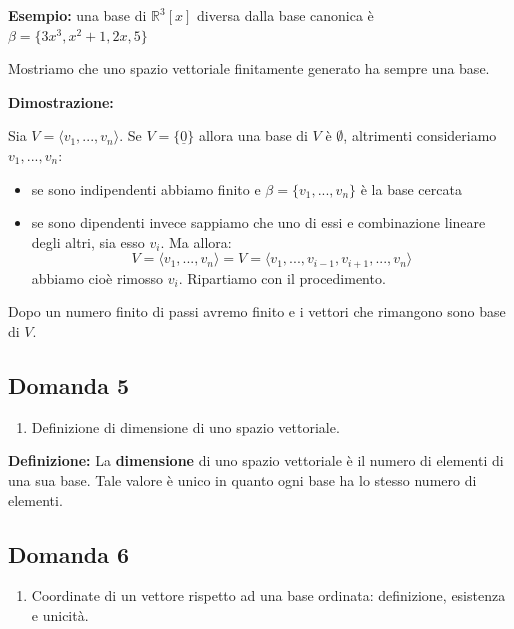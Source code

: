 \documentclass[
  a4paper,
]{article}
\providecommand{\tightlist}{%
  \setlength{\itemsep}{0pt}\setlength{\parskip}{0pt}}
\providecommand{\tightlist}{}
\begin{document}
\textbf{Esempio:} una base di \(\mathbb{R}^3[x]\) diversa dalla base
canonica è \(\beta = \{ 3x^3, x^2 + 1, 2x, 5\}\)

\bigskip

Mostriamo che uno spazio vettoriale finitamente generato ha sempre una
base.

\textbf{Dimostrazione:}

Sia \(V = \langle v_1, ..., v_n \rangle\). Se \(V = \{\underline 0\}\)
allora una base di \(V\) è \(\emptyset\), altrimenti consideriamo
\(v_1, ..., v_n\):

\begin{itemize}
\tightlist
\item
  se sono indipendenti abbiamo finito e \(\beta = \{v_1, ..., v_n\}\) è
  la base cercata
\item
  se sono dipendenti invece sappiamo che uno di essi e combinazione
  lineare degli altri, sia esso \(v_i\). Ma allora: \[
  V = \langle v_1, ..., v_n \rangle = V = \langle v_1, ..., v_{i-1}, v_{i+1}, ...,  v_n \rangle
  \] abbiamo cioè rimosso \(v_i\). Ripartiamo con il procedimento.
\end{itemize}

Dopo un numero finito di passi avremo finito e i vettori che rimangono
sono base di \(V\).

\hypertarget{domanda-5}{%
\subsection{Domanda 5}\label{domanda-5}}

\begin{observationbox}[Domanda]
\begin{enumerate}
\def\labelenumi{\arabic{enumi}.}
\setcounter{enumi}{4}
\tightlist
\item
  Definizione di dimensione di uno spazio vettoriale.
\end{enumerate}
\end{observationbox}

\textbf{Definizione:} La \textbf{dimensione} di uno spazio vettoriale è
il numero di elementi di una sua base. Tale valore è unico in quanto
ogni base ha lo stesso numero di elementi.

\hypertarget{domanda-6}{%
\subsection{Domanda 6}\label{domanda-6}}

\begin{observationbox}[Domanda]
\begin{enumerate}
\def\labelenumi{\arabic{enumi}.}
\setcounter{enumi}{5}
\tightlist
\item
  Coordinate di un vettore rispetto ad una base ordinata: definizione,
  esistenza e unicità.
\end{enumerate}
\end{observationbox}
\end{document}
